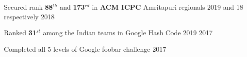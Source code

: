 \begin{cvhonors}
{\Large
  \cvhonor
  {Secured rank \textbf{88$^{th}$} and \textbf{173$^{rd}$} in \textbf{ACM ICPC} Amritapuri regionals 2019 and 18 respectively}
  {}
  {2018}
  
  \cvhonor
  {Ranked \textbf{31$^{st}$} among the Indian teams in Google Hash Code 2019}
  {}
  {2017}

  \cvhonor
  {Completed all 5 levels of Google foobar challenge}
  {}
  {2017}

}
\end{cvhonors}

